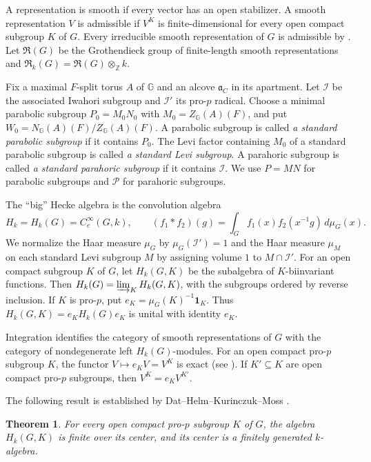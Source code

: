 \documentclass[11pt,letterpaper]{amsart}
\newtheorem{theorem}{Theorem}
\theoremstyle{definition}
\numberwithin{equation}{section}
\numberwithin{theorem}{section}
\newcommand{\kk}{k}
\newcommand{\CI}{\mathcal I}
\newcommand{\G}{\mathbb G}
\newcommand{\cR}{\mathfrak R}
\begin{document}
A representation is smooth if every vector has an open stabilizer.
A smooth representation $V$ is admissible if $V^K$ is
finite-dimensional for every open compact subgroup $K$ of $G$.
Every irreducible smooth representation of $G$ is admissible
by \cite[Proposition~4.10(iv)]{HV}.
Let $\cR(G)$ be the Grothendieck group of finite-length smooth
representations and
$\cR_\kk(G)=\cR(G)\otimes_{\mathbb Z}\kk$.

Fix a maximal $F$-split torus $A$ of $\G$ and an
alcove $\mathfrak a_C$ in its apartment. Let $\CI$ be the
associated Iwahori subgroup and $\CI'$ its pro-$p$ radical.
Choose a minimal parabolic subgroup $P_0=M_0N_0$ with
$M_0=Z_\G(A)(F)$, and put
$W_0=N_\G(A)(F)/Z_\G(A)(F)$.
A parabolic subgroup is called {\it a standard parabolic subgroup} if it contains $P_0$.
The Levi factor containing $M_0$ of a standard parabolic subgroup is called {\it a standard Levi subgroup}.
A parahoric subgroup is called {\it a standard parahoric subgroup} if it contains $\CI$.
We use $P=MN$ for parabolic subgroups and $\mathcal P$
for parahoric subgroups.

The ``big'' Hecke algebra is the convolution algebra
\[
H_\kk=H_\kk(G)=C_c^\infty(G,\kk),\qquad
 (f_1*f_2)(g)=\int_G f_1(x)f_2(x^{-1}g)\, d\mu_G(x).
\]
We normalize the Haar measure $\mu_G$ by $\mu_G(\CI')=1$ and the Haar measure $\mu_M$ on each standard Levi subgroup $M$ by assigning volume $1$ to $M\cap\CI'$.
For an open compact subgroup $K$ of $G$, let $H_\kk(G,K)$ be
the subalgebra of $K$-biinvariant functions. Then
$H_\kk(G)=\varinjlim_K H_\kk(G,K)$, with the subgroups ordered by
reverse inclusion. If $K$ is pro-$p$, put
$e_K=\mu_G(K)^{-1}\mathbf 1_K$. Thus $H_\kk(G,K)=e_K H_\kk(G)e_K$ is
unital with identity $e_K$.

Integration identifies the category of smooth representations
of $G$ with the category of nondegenerate left
$H_\kk(G)$-modules. For an open compact pro-$p$ subgroup $K$,
the functor $V\mapsto e_KV=V^K$ is exact (see \cite[\S3.1]{HV}).
If $K'\subseteq K$ are open compact pro-$p$ subgroups,
then $V^K=e_KV^{K'}$.

The following result is established by Dat--Helm--Kurinczuk--Moss \cite{DHKM}.

\begin{theorem}\label{thm:finiteness}
For every open compact pro-$p$ subgroup $K$ of $G$, the
algebra $H_\kk(G,K)$ is finite over its center, and its center
is a finitely generated $\kk$-algebra.
\end{theorem}
\end{document}
